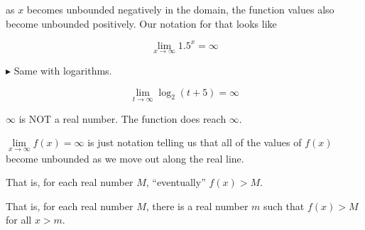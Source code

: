 \documentclass{ximera}
\begin{document}
as $x$ becomes unbounded negatively in the domain, the function values also become unbounded positively. Our notation for that looks like 


\[   \lim\limits_{x \to \infty} 1.5^x   = \infty      \]






$\blacktriangleright$  Same with logarithms.  

\[   \lim\limits_{t \to \infty} \log_2(t+5)   = \infty      \]

\begin{image}
\end{image}





\begin{warning}


$\infty$ is NOT a real number.  The function does reach $\infty$.  

$\lim\limits_{x \to \infty} f(x) = \infty$ is just notation telling us that all of the values of $f(x)$ become unbounded as we move out along the real line.  

That is, for each real number $M$, ``eventually'' $f(x) > M$.

That is, for each real number $M$, there is a real number $m$ such that $f(x) > M$ for all $x > m$.


\end{warning}
\end{document}
